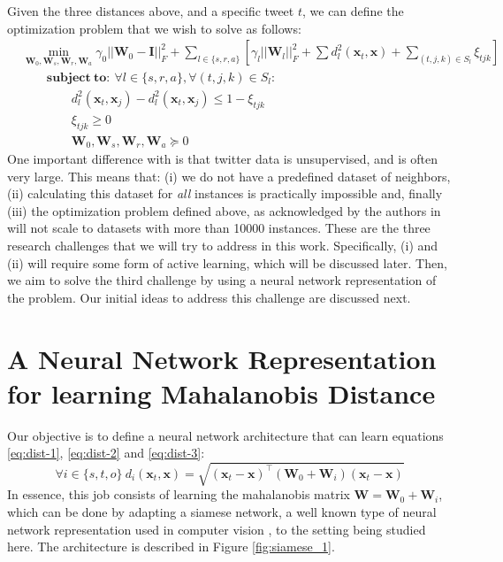 \documentclass[letterpaper]{article}
\begin{document}
Given the three distances above, and a specific tweet $t$, we can define the optimization problem that we wish to solve as follows: 
{\footnotesize
\begin{align}
&\min_{\mathbf{W}_0, \mathbf{W}_s, \mathbf{W}_r, \mathbf{W}_a} \gamma_0 || \mathbf{W}_0 - \mathbf{I}||^2_F + \sum_{l \in \{s, r, a\}} \left[  \gamma_l || \mathbf{W}_l ||^2_F + \sum d_{l}^2 ( \mathbf{x}_t, \mathbf{x} ) + \sum_{(t,j,k) \in S_l} \xi_{tjk} \right]\\
&\quad \quad \mathbf{subject\ to:}\ \forall l \in \{ s, r, a\}, \forall (t, j, k) \in S_l: \\
& \quad \quad \quad \quad d^2_l ( \mathbf{x}_t,  \mathbf{x}_j) - d^2_l ( \mathbf{x}_t,  \mathbf{x}_j) \leq 1 - \xi_{tjk}\\ 
& \quad \quad \quad \quad \xi_{tjk} \geq 0\\
& \quad \quad \quad \quad \mathbf{W}_0, \mathbf{W}_s, \mathbf{W}_r, \mathbf{W}_a \succeq	0
\end{align}
}
One important difference with \cite{Parameswaran2010a} is that twitter data is unsupervised, and is often very large. This means that: (i) we do not have a predefined dataset of neighbors, (ii) calculating this dataset for \emph{all} instances is practically impossible and, finally (iii) the optimization problem defined above, as acknowledged by the authors in \cite{Parameswaran2010a} will not scale to datasets with more than 10000 instances.  These are the three research challenges that we will try to address in this work. Specifically, (i) and (ii) will require some form of active learning, which will be discussed later. Then, we aim to solve the third challenge by using a neural network representation of the problem. Our initial ideas to address this challenge are discussed next.

\section{A Neural Network Representation for learning Mahalanobis Distance}

Our objective is to define a neural network architecture that can learn equations \ref{eq:dist-1}, \ref{eq:dist-2} and \ref{eq:dist-3}: 
\begin{equation}
\forall i \in \{s, t, o\}\  d_i(\mathbf{x}_t, \mathbf{x}) = \sqrt{( \mathbf{x}_t - \mathbf{x})^\intercal(\mathbf{W}_0 + \mathbf{W}_i) ( \mathbf{x}_t - \mathbf{x})} 
\end{equation}
In essence, this job consists of learning the mahalanobis matrix $\mathbf{W} = \mathbf{W}_0 + \mathbf{W}_i$, which can be done by adapting a siamese network, a well known type of neural network representation used in computer vision \cite{Chopra2005a, Zagoryuko2015}, to the setting being studied here. The architecture is described in Figure \ref{fig:siamese_1}.  
\end{document}
